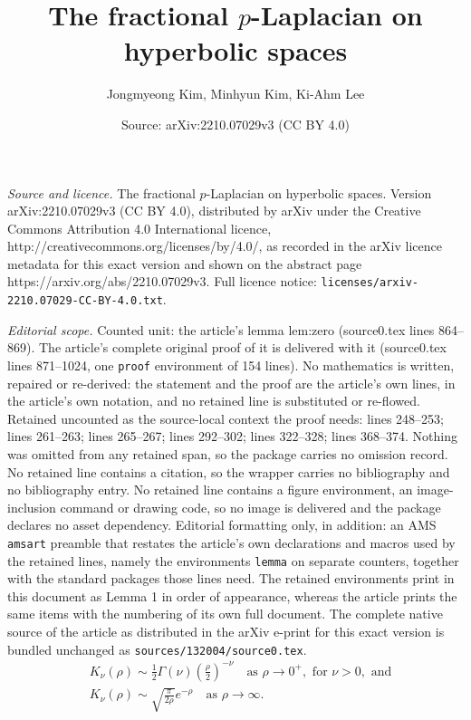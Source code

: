 \documentclass[10pt,a4paper]{amsart}
\title{The fractional $p$-Laplacian on hyperbolic spaces}
\author{Jongmyeong Kim, Minhyun Kim, Ki-Ahm Lee}
\date{Source: arXiv:2210.07029v3 (CC BY 4.0)}
\begin{document}
\maketitle

\noindent\emph{Source and licence.} The fractional $p$-Laplacian on hyperbolic spaces. Version arXiv:2210.07029v3 (CC BY 4.0), distributed by arXiv under the Creative Commons Attribution 4.0 International licence, http://creativecommons.org/licenses/by/4.0/, as recorded in the arXiv licence metadata for this exact version and shown on the abstract page https://arxiv.org/abs/2210.07029v3. Full licence notice: \texttt{licenses/arxiv-2210.07029-CC-BY-4.0.txt}.\par\smallskip

\noindent\textit{Editorial scope.} Counted unit: the article's lemma lem:zero (source0.tex lines 864--869). The article's complete original proof of it is delivered with it (source0.tex lines 871--1024, one \texttt{proof} environment of 154 lines). No mathematics is written, repaired or re-derived: the statement and the proof are the article's own lines, in the article's own notation, and no retained line is substituted or re-flowed.  Retained uncounted as the source-local context the proof needs: lines 248--253; lines 261--263; lines 265--267; lines 292--302; lines 322--328; lines 368--374.  Nothing was omitted from any retained span, so the package carries no omission record.  No retained line contains a citation, so the wrapper carries no bibliography and no bibliography entry.  No retained line contains a figure environment, an image-inclusion command or drawing code, so no image is delivered and the package declares no asset dependency.  Editorial formatting only, in addition: an AMS \texttt{amsart} preamble that restates the article's own declarations and macros used by the retained lines, namely the environments \texttt{lemma} on separate counters, together with the standard packages those lines need.  The retained environments print in this document as Lemma 1 in order of appearance, whereas the article prints the same items with the numbering of its own full document.  The complete native source of the article as distributed in the arXiv e-print for this exact version is bundled unchanged as \texttt{sources/132004/source0.tex}.
\begin{equation} \label{eq:K-asymptotic}
\begin{split}
&K_{\nu}(\rho) \sim \frac{1}{2} \Gamma(\nu) \left( \frac{\rho}{2} \right)^{-\nu} \quad\text{as } \rho \to 0^{+}, \text{ for } \nu > 0, \text{ and} \\
&K_{\nu}(\rho) \sim \sqrt{\frac{\pi}{2\rho}} e^{-\rho} \quad\text{as } \rho \to \infty.
\end{split}
\end{equation}
\end{document}
